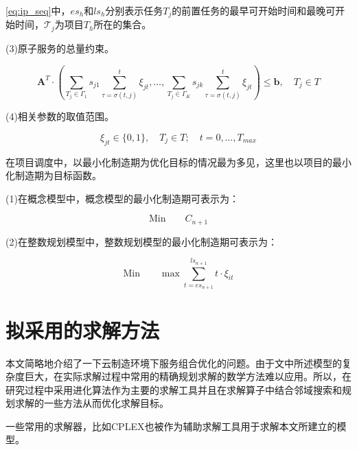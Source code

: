 \documentclass[UTF8]{ctexart}
\begin{document}
\cref{eq:ip_seq}中，$es_h$和$ls_h$分别表示任务$T_j$的前置任务的最早可开始时间和最晚可开始时间，$\mathcal{T}_j$为项目$T_h$所在的集合。

(3)原子服务的总量约束。

\begin{equation}
\label{eq:ip_amo}
\bm{A}^T\cdot \left(\sum_{T_j\in \Gamma_1} s_{j1} \sum_{\tau=\sigma(t,j)}^t \xi_{jt}, \dots, \sum_{T_j\in \Gamma_K} s_{jk} \sum_{\tau=\sigma(t,j)}^t \xi_{jt}\right) \leqslant \bm{b}, \quad  T_j \in T
\end{equation}

(4)相关参数的取值范围。

\begin{equation}
\label{eq:ip_dec_val}
\xi_{jt} \in \{0, 1\}, \quad  T_j\in T;\quad t = 0, \dots, T_{max}
\end{equation}

在项目调度中，以最小化制造期为优化目标的情况最为多见，这里也以项目的最小化制造期为目标函数。

(1)在概念模型中，概念模型的最小化制造期可表示为：

\begin{equation}
\label{eq:con_obj_func}
\text{Min} \qquad C_{n+1}
\end{equation}

(2)在整数规划模型中，整数规划模型的最小化制造期可表示为：

\begin{equation}
\label{eq:ip_obj_func}
\text{Min} \qquad \max\sum_{t=es_{n+1}}^{ls_{n+1}} t\cdot\xi_{it}
\end{equation}


\section{拟采用的求解方法}
\label{Sol}
本文简略地介绍了一下云制造环境下服务组合优化的问题。由于文中所述模型的复杂度巨大，在实际求解过程中常用的精确规划求解的数学方法难以应用。所以，在研究过程中采用进化算法作为主要的求解工具并且在求解算子中结合邻域搜索和规划求解的一些方法从而优化求解目标。

一些常用的求解器，比如CPLEX也被作为辅助求解工具用于求解本文所建立的模型。




\end{document}
